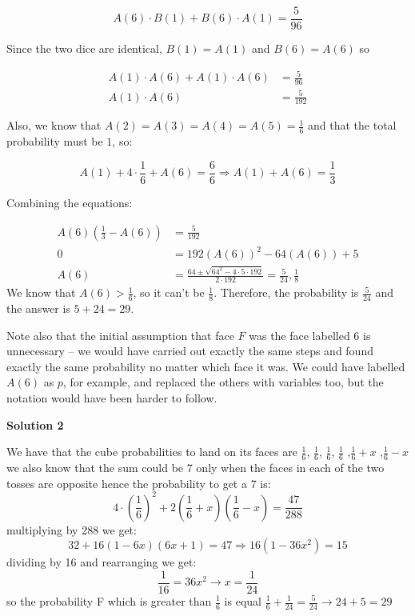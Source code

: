 \begin{enumerate}
 
 \[A(6)\cdot B(1)+B(6)\cdot A(1)=\frac{5}{96}\]

 Since the two dice are identical, $B(1)=A(1)$ and $B(6)=A(6)$ so

 
 \begin{align*}A(1)\cdot A(6)+A(1)\cdot A(6)&=\frac{5}{96}\\ A(1)\cdot A(6)&=\frac{5}{192}\end{align*}


 Also, we know that $A(2)=A(3)=A(4)=A(5)=\frac{1}{6}$ and that the total probability must be $1$, so:

 
 \[A(1)+4 \cdot \frac{1}{6}+A(6)=\frac{6}{6} \Longrightarrow A(1)+A(6)=\frac{1}{3}\]

 Combining the equations:

 
 \begin{align*}A(6)\left(\frac{1}{3}-A(6)\right)&=\frac{5}{192}\\ 0 &= 192 \left(A(6)\right)^2 - 64 \left(A(6)\right) + 5\\ A(6)&=\frac{64\pm\sqrt{64^2 - 4 \cdot 5 \cdot 192}}{2\cdot192} =\frac{5}{24}, \frac{1}{8}\end{align*}
We know that $A(6)>\frac{1}{6}$, so it can't be $\frac{1}{8}$. Therefore, the probability is $\frac{5}{24}$ and the answer is $5+24=\boxed{29}$.

 Note also that the initial assumption that face $F$ was the face labelled 6 is unnecessary -- we would have carried out exactly the same steps and found exactly the same probability no matter which face it was. We could have labelled $A(6)$ as $p$, for example, and replaced the others with variables too, but the notation would have been harder to follow.

 



\textbf{Solution 2}

We have that the cube probabilities to land on its faces are $\frac{1}{6}$, $\frac{1}{6}$, $\frac{1}{6}$, $\frac{1}{6}$ ,$\frac{1}{6}+x$ ,$\frac{1}{6}-x$we also know that the sum could be 7 only when the faces in each of the two tosses are opposite hence the probability to get a 7 is:
 \[4 \cdot \left(\frac{1}{6} \right)^2+2 \left(\frac{1}{6}+x \right) \left(\frac{1}{6}-x \right)=\frac{47}{288}\]multiplying by 288 we get:
 \[32+16(1-6x)(6x+1)=47 \Longrightarrow 16(1-36x^2)=15\]dividing by 16 and rearranging we get:
 \[\frac{1}{16}=36x^2 \longrightarrow x=\frac{1}{24}\]so the probability F  which is greater than $\frac{1}{6}$ is equal $\frac{1}{6}+\frac{1}{24}=\frac{5}{24}\longrightarrow 24+5=\boxed{29}$





\end{enumerate}
